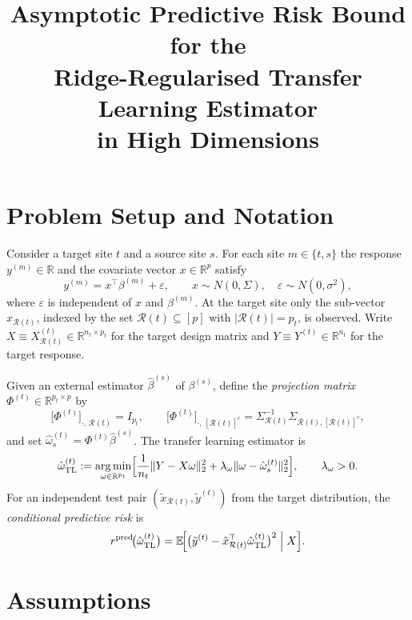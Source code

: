 \documentclass[11pt]{article}
\title{Asymptotic Predictive Risk Bound for the\\[4pt]
  Ridge-Regularised Transfer Learning Estimator\\[4pt]
  in High Dimensions}
\author{}
\date{}
\theoremstyle{definition}
\newcommand{\Rt}{\mathcal{R}(t)}
\newcommand{\Rtc}{[\mathcal{R}(t)]^c}
\newcommand{\Sig}{\Sigma}
\newcommand{\SigR}{\Sigma_{\Rt}}
\newcommand{\SigRRc}{\Sigma_{\Rt,\Rtc}}
\newcommand{\bhat}{\hat{\beta}}
\newcommand{\ohat}{\hat{\omega}}
\newcommand{\E}{\mathbb{E}}
\DeclareMathOperator*{\argmin}{arg\,min}
\newcommand{\R}{\mathbb{R}}
\begin{document}
\maketitle
 
\section{Problem Setup and Notation}\label{sec:setup}
 
Consider a target site $t$ and a source site $s$.  For each site
$m\in\{t,s\}$ the response $y^{(m)}\in\R$ and the covariate vector
$x\in\R^p$ satisfy
\[
  y^{(m)} = x^\top \beta^{(m)}+\varepsilon,
  \qquad x\sim N(0,\Sig),\quad
  \varepsilon\sim N(0,\sigma^2),
\]
where $\varepsilon$ is independent of $x$ and $\beta^{(m)}$.
At the target site only the sub-vector $x_{\Rt}$, indexed by the set
$\Rt\subseteq[p]$ with $|\Rt|=p_t$, is observed.  Write
$X\equiv X^{(t)}_{\Rt}\in\R^{n_t\times p_t}$ for the target design
matrix and $Y\equiv Y^{(t)}\in\R^{n_t}$ for the target response.
 
Given an external estimator $\bhat^{(s)}$ of $\beta^{(s)}$, define the
\emph{projection matrix}
$\Phi^{(t)}\in\R^{p_t\times p}$ by
\begin{equation}\label{eq:Phi}
  \bigl[\Phi^{(t)}\bigr]_{\cdot,\,\Rt}=I_{p_t},
  \qquad
  \bigl[\Phi^{(t)}\bigr]_{\cdot,\,\Rtc}
  =\SigR^{-1}\SigRRc,
\end{equation}
and set $\ohat_s^{(t)}=\Phi^{(t)}\bhat^{(s)}$.  The transfer learning
estimator is
\begin{equation}\label{eq:TL}
  \ohat_{\mathrm{TL}}^{(t)}
  :=\argmin_{\omega\in\R^{p_t}}
  \Bigl[\frac{1}{n_t}\|Y-X\omega\|_2^2
        +\lambda_\omega\|\omega-\ohat_s^{(t)}\|_2^2\Bigr],
  \qquad \lambda_\omega>0.
\end{equation}
For an independent test pair
$(\tilde x_{\Rt},\tilde y^{(t)})$ from the target distribution, the
\emph{conditional predictive risk} is
\[
  r^{\mathrm{pred}}\!\bigl(\ohat_{\mathrm{TL}}^{(t)}\bigr)
  =\E\!\Bigl[
     \bigl(\tilde y^{(t)}
           -\tilde x_{\Rt}^\top\ohat_{\mathrm{TL}}^{(t)}\bigr)^2
     \;\Big|\; X\Bigr].
\]
 
\section{Assumptions}\label{sec:assumptions}
 
\end{document}
